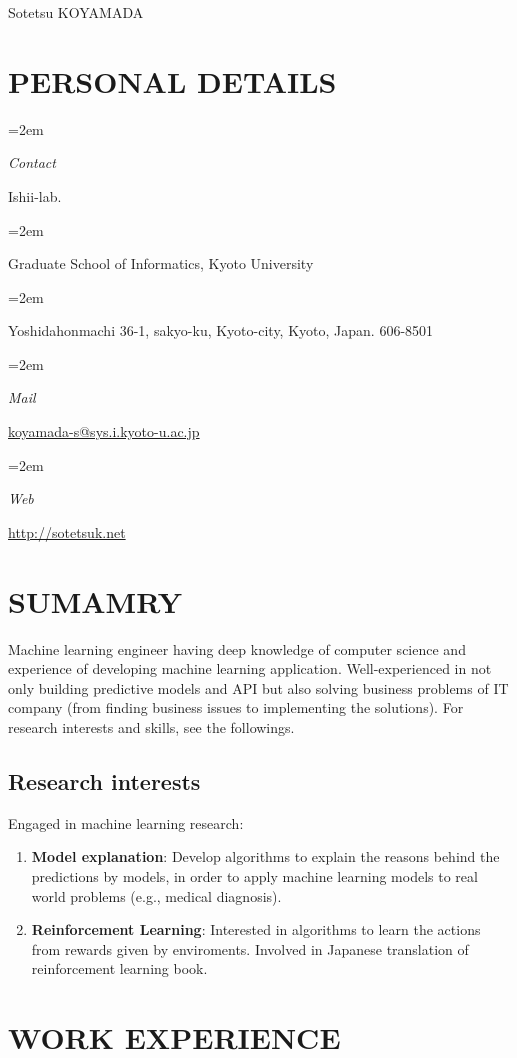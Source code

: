 \documentclass[paper=a4,fontsize=11pt]{scrartcl} %
\newlength{\spacebox}
\newcommand{\sepspace}{\vspace*{1em}}		%
\newcommand{\MyName}[1]{ %
		\Huge \usefont{OT1}{phv}{b}{n} \hfill #1
		\par \normalsize \normalfont}
\newcommand{\MySlogan}[1]{ %
		\large \usefont{OT1}{phv}{m}{n}\hfill \textit{#1}
		\par \normalsize \normalfont}
\newcommand{\NewPart}[1]{\section*{\uppercase{#1}}}
\newcommand{\PersonalEntry}[2]{
		\noindent\hangindent=2em\hangafter=0 %
		\parbox{\spacebox}{        %
		\textit{#1}}		       %
		\hspace{1.5em} #2 \par}    %
\begin{document}

\MyName{Sotetsu KOYAMADA}

\sepspace

\NewPart{Personal details}{}

\PersonalEntry{Contact}{Ishii-lab.}
\PersonalEntry{}{Graduate School of Informatics, Kyoto University}
\PersonalEntry{}{Yoshidahonmachi 36-1, sakyo-ku, Kyoto-city, Kyoto, Japan. 606-8501}
\PersonalEntry{Mail}{\url{koyamada-s@sys.i.kyoto-u.ac.jp}}
\PersonalEntry{Web}{\url{http://sotetsuk.net}}

\NewPart{Sumamry}{}

Machine learning engineer
having deep knowledge of computer science and
experience of developing machine learning application.
Well-experienced in not only building predictive models and API
but also solving business problems of IT company (from finding business issues to implementing the solutions).
For research interests and skills, see the followings.

\subsection*{Research interests}
Engaged in machine learning research:

\begin{enumerate}
  \item {\bf Model explanation}: Develop algorithms to explain the reasons behind the predictions by models, in order to apply machine learning models to real world problems (e.g., medical diagnosis).
	\item {\bf Reinforcement Learning}: Interested in algorithms to learn the actions from rewards given by enviroments. Involved in Japanese translation of reinforcement learning book.
\end{enumerate}

\NewPart{Work experience}{}
\end{document}
